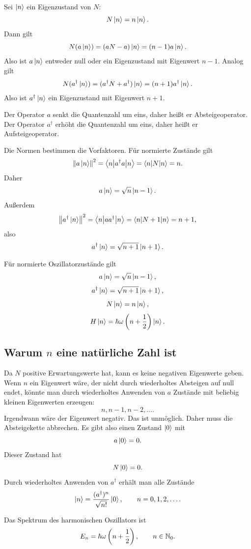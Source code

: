 Sei $\left|n\right\rangle$ ein Eigenzustand von $N$:
\[
    N\left|n\right\rangle=n\left|n\right\rangle.
\]
Dann gilt
\[
    N(a\left|n\right\rangle)=(aN-a)\left|n\right\rangle=(n-1)a\left|n\right\rangle.
\]
Also ist $a\left|n\right\rangle$ entweder null oder ein Eigenzustand mit Eigenwert $n-1$.
Analog gilt
\[
    N(a^\dagger\left|n\right\rangle)=(a^\dagger N+a^\dagger)\left|n\right\rangle=(n+1)a^\dagger\left|n\right\rangle.
\]
Also ist $a^\dagger\left|n\right\rangle$ ein Eigenzustand mit Eigenwert $n+1$.

\begin{conceptbox}
Der Operator $a$ senkt die Quantenzahl um eins, daher heißt er Absteigeoperator. Der Operator $a^\dagger$ erhöht die Quantenzahl um eins, daher heißt er Aufsteigeoperator.
\end{conceptbox}

Die Normen bestimmen die Vorfaktoren. Für normierte Zustände gilt
\[
    \left\lVert a\left|n\right\rangle \right\rVert^2=\left\langle n\middle|a^\dagger a\middle|n\right\rangle=\left\langle n\middle|N\middle|n\right\rangle=n.
\]
Daher
\[
    a\left|n\right\rangle=\sqrt n\left|n-1\right\rangle.
\]
Außerdem
\[
    \left\lVert a^\dagger\left|n\right\rangle \right\rVert^2=\left\langle n\middle|aa^\dagger\middle|n\right\rangle=\left\langle n\middle|N+1\middle|n\right\rangle=n+1,
\]
also
\[
    a^\dagger\left|n\right\rangle=\sqrt{n+1}\left|n+1\right\rangle.
\]

\begin{formulabox}
Für normierte Oszillatorzustände gilt
\[
    a\left|n\right\rangle=\sqrt n\left|n-1\right\rangle,
\]
\[
    a^\dagger\left|n\right\rangle=\sqrt{n+1}\left|n+1\right\rangle,
\]
\[
    N\left|n\right\rangle=n\left|n\right\rangle,
\]
\[
    H\left|n\right\rangle=\hbar\omega\left(n+\frac12\right)\left|n\right\rangle.
\]
\end{formulabox}

\subsection{Warum $n$ eine natürliche Zahl ist}

Da $N$ positive Erwartungswerte hat, kann es keine negativen Eigenwerte geben. Wenn $n$ ein Eigenwert wäre, der nicht durch wiederholtes Absteigen auf null endet, könnte man durch wiederholtes Anwenden von $a$ Zustände mit beliebig kleinen Eigenwerten erzeugen:
\[
    n,
    n-1,
    n-2,
    \dots.
\]
Irgendwann wäre der Eigenwert negativ. Das ist unmöglich. Daher muss die Absteigekette abbrechen. Es gibt also einen Zustand $\left|0\right\rangle$ mit
\[
    a\left|0\right\rangle=0.
\]
Dieser Zustand hat
\[
    N\left|0\right\rangle=0.
\]
Durch wiederholtes Anwenden von $a^\dagger$ erhält man alle Zustände
\[
    \left|n\right\rangle=\frac{(a^\dagger)^n}{\sqrt{n!}}\left|0\right\rangle,
    \qquad n=0,1,2,\dots.
\]

\begin{formulabox}
Das Spektrum des harmonischen Oszillators ist
\[
    E_n=\hbar\omega\left(n+\frac12\right),
    \qquad n\in\mathbb{N}_0.
\]
\end{formulabox}

